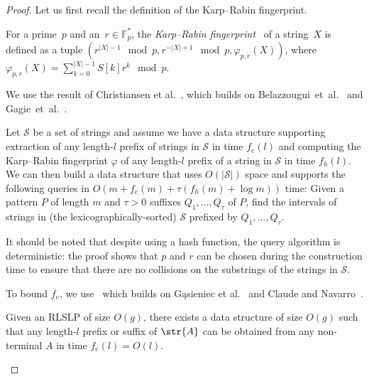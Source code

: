 \begin{proof}
    Let us first recall the definition of the Karp--Rabin fingerprint.
    
    \begin{definition}
    For a prime~$p$ and an~$r \in \mathbb{F}_p^\ast$, the \emph{Karp--Rabin fingerprint}~\cite{karp1987efficient} of a string~$X$ is defined as a tuple $(r^{|X|-1} \mod p, r^{-|X|+1} \mod p, \varphi_{p,r}(X))$, where $\varphi_{p,r}(X)=\sum_{k=0}^{|X|-1} S[k]r^k\mod p$.
    \end{definition}
    
    \noindent We use the result of Christiansen et al.~\cite{talg/ChristiansenEKN21}, which builds on Belazzougui~et~al.~\cite{esa/BelazzouguiBPV10} and Gagie~et~al.~\cite{latin/GagieGKNP14,soda/GagieNP18}.
     
    \begin{fact}\label{fact:compact_trie}
    Let $\mathcal{S}$ be a set of strings and assume we have a data structure supporting extraction of any length-$l$ prefix of strings in $\mathcal{S}$ in
    time $f_e(l)$ and computing the Karp--Rabin fingerprint $\varphi$ of any length-$l$ prefix of a string in $\mathcal{S}$
    in time $f_h(l)$. We can then build a data structure that uses $O(|\mathcal{S}|)$ space and supports the following queries in $O(m + f_e (m) + \tau ( f_h (m) + \log m))$ time: Given a pattern $P$ of length $m$ and $\tau > 0$
    suffixes $Q_1,\dots,Q_{\tau}$ of $P$, find the intervals of strings in (the lexicographically-sorted) $\mathcal{S}$ prefixed by
    $Q_1,\dots,Q_{\tau}$.
    \end{fact}
    
    It should be noted that despite using a hash function, the query algorithm is deterministic: the proof shows that $p$ and $r$ can be chosen during the construction time to ensure that there are no collisions on the substrings of the strings in $\mathcal{S}$.  
    
    To bound $f_e$, we use~\cite[Lemma 6.6]{talg/ChristiansenEKN21} which builds on G\k{a}sieniec et al.~\cite{dcc/GasieniecKPS05} and Claude and Navarro~\cite{spire/ClaudeN12a}.
    
    \begin{fact}\label{fact:prefsuf_extraction} Given an RLSLP
    of size $O(g)$, there exists a data structure of size $O(g)$ such that any length-$l$ prefix or suffix of $\str{A}$ can be
    obtained from any non-terminal $A$ in time $f_e(l) = O(l)$.
    \end{fact}
    

\end{proof}
